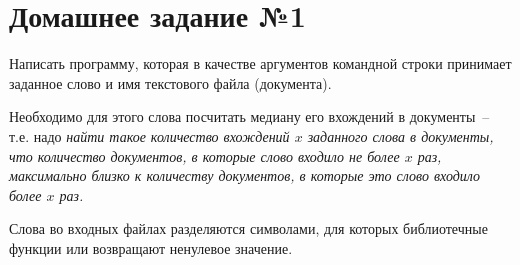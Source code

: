 \section*{Домашнее задание №1}

Написать программу, которая в качестве аргументов командной строки
принимает заданное слово и имя текстового файла (документа).

Необходимо для этого слова посчитать медиану его
вхождений в документы~-- т.е. надо \textit{найти такое количество вхождений $x$
заданного слова в документы, что количество документов, в которые слово
входило не более $x$ раз, максимально близко к количеству документов, в
которые это слово входило более $x$ раз.}

Слова во входных файлах разделяются символами, для которых
библиотечные функции  или  возвращают ненулевое
значение.
